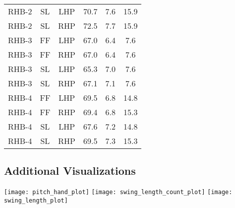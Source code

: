 \documentclass[
]{article}
\begin{document}
\begin{table}[H]
\begin{tabular}[t]{cccccc}
RHB-2 & SL & LHP & 70.7 & 7.6 & 15.9\\
RHB-2 & SL & RHP & 72.5 & 7.7 & 15.9\\
RHB-3 & FF & LHP & 67.0 & 6.4 & 7.6\\
\addlinespace
RHB-3 & FF & RHP & 67.0 & 6.4 & 7.6\\
RHB-3 & SL & LHP & 65.3 & 7.0 & 7.6\\
RHB-3 & SL & RHP & 67.1 & 7.1 & 7.6\\
RHB-4 & FF & LHP & 69.5 & 6.8 & 14.8\\
RHB-4 & FF & RHP & 69.4 & 6.8 & 15.3\\
\addlinespace
RHB-4 & SL & LHP & 67.6 & 7.2 & 14.8\\
RHB-4 & SL & RHP & 69.5 & 7.3 & 15.3\\
\bottomrule
\end{tabular}
\end{table}

\hypertarget{additional-visualizations}{%
\subsection{Additional Visualizations}\label{additional-visualizations}}

\begin{center}\texttt{[image: pitch\_hand\_plot]} \texttt{[image: swing\_length\_count\_plot]} \texttt{[image: swing\_length\_plot]} \end{center}
\end{document}
